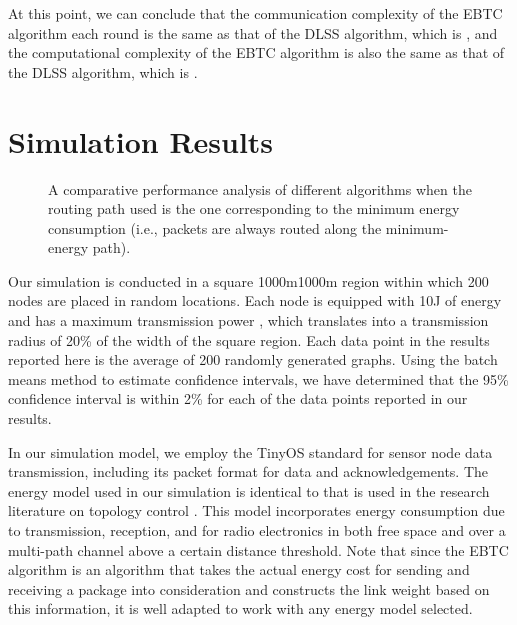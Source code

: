 \documentclass[journal,12pt,onecolumn]{IEEEtran}
\begin{document}
At this point, we can conclude that the communication complexity of
the EBTC algorithm each round is the same as that of the DLSS
algorithm, which is , and the computational complexity of
the EBTC algorithm is also the same as that of the DLSS algorithm,
which is .

\section{Simulation Results}\label{sec:performance}
\begin{figure*}[!t]
\begin{center}
    \hskip0.2in
    \hskip0.2in
   \caption{A comparative performance analysis of different algorithms
     when the routing path used is the one corresponding to the minimum
     energy consumption (i.e., packets are always routed along the
     minimum-energy path). }\label{fig:Type1}
\end{center}
\vspace{-12pt}
\end{figure*}
Our simulation is conducted in a square 1000m1000m region
within which 200 nodes are placed in random locations. Each node is
equipped with 10J of energy and has a maximum transmission power
, which translates into a transmission radius of 20\%
of the width of the square region. Each data point in the results
reported here is the average of 200 randomly generated graphs. Using
the batch means method to estimate confidence intervals, we have
determined that the 95\% confidence interval is within 2\% for
each of the data points reported in our results.

In our simulation
model, we employ the TinyOS standard \cite{tinyos} for sensor node
data transmission, including its packet format for data and
acknowledgements. The energy model used in our simulation is identical to that is used
in the research literature on topology control
\cite{HeiCha2002,KolPav2011}. This model incorporates
energy consumption due to transmission, reception, and for radio
electronics in both free space and over a multi-path channel above a
certain distance threshold. Note that since the EBTC algorithm is an algorithm that takes the actual energy cost for sending and receiving a package into consideration and constructs the link weight based on this information, it is well adapted to work with any energy model selected.
\end{document}
